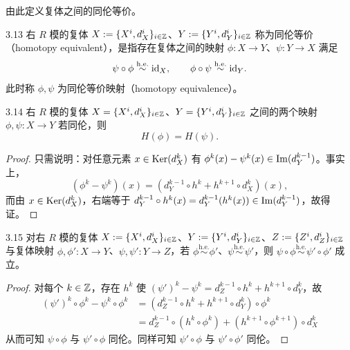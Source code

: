 
由此定义复体之间的同伦等价。

\begin{definition}{3.13}
右 $R$ 模的复体 $X:=\{X^i,d_X^i\}_{i\in\mathbb{Z}}$、$Y:=\{Y^i,d_Y^i\}_{i\in\mathbb{Z}}$ 称为同伦等价（homotopy equivalent），是指存在复体之间的映射 $\phi\colon X\to Y$、$\psi\colon Y\to X$ 满足
\[
\psi\circ\phi\overset{\mathrm{h.e.}}{\sim}\mathrm{id}_X,\qquad \phi\circ\psi\overset{\mathrm{h.e.}}{\sim}\mathrm{id}_Y.
\]
此时称 $\phi,\psi$ 为同伦等价映射（homotopy equivalence）。
\end{definition}

\begin{theorem}{3.14}
右 $R$ 模的复体 $X=\{X^i,d_X^i\}_{i\in\mathbb{Z}}$、$Y=\{Y^i,d_Y^i\}_{i\in\mathbb{Z}}$ 之间的两个映射 $\phi,\psi\colon X\to Y$ 若同伦，则
\[
H(\phi)=H(\psi).
\]
\end{theorem}

\begin{proof}
只需说明：对任意元素 $x\in\operatorname{Ker}(d_X^k)$ 有 $\phi^k(x)-\psi^k(x)\in\operatorname{Im}(d_Y^{k-1})$。事实上，
\[
(\phi^k-\psi^k)(x)=(d_Y^{k-1}\circ h^k+h^{k+1}\circ d_X^k)(x),
\]
而由 $x\in\operatorname{Ker}(d_X^k)$，右端等于 $d_Y^{k-1}\circ h^k(x)=d_Y^{k-1}(h^k(x))\in\operatorname{Im}(d_Y^{k-1})$，故得证。
\end{proof}

\begin{lemma}{3.15}
对右 $R$ 模的复体 $X:=\{X^i,d_X^i\}_{i\in\mathbb{Z}}$、$Y:=\{Y^i,d_Y^i\}_{i\in\mathbb{Z}}$、$Z:=\{Z^i,d_Z^i\}_{i\in\mathbb{Z}}$ 与复体映射 $\phi,\phi'\colon X\to Y$、$\psi,\psi'\colon Y\to Z$，若 $\phi\overset{\mathrm{h.e.}}{\sim}\phi'$、$\psi\overset{\mathrm{h.e.}}{\sim}\psi'$，则 $\psi\circ\phi\overset{\mathrm{h.e.}}{\sim}\psi'\circ\phi'$ 成立。
\end{lemma}

\begin{proof}
对每个 $k\in\mathbb{Z}$，存在 $h^k$ 使 $(\psi')^k-\psi^k=d_Z^{k-1}\circ h^k+h^{k+1}\circ d_Y^k$，故
\[
\begin{aligned}
(\psi')^k\circ\phi^k-\psi^k\circ\phi^k
&=(d_Z^{k-1}\circ h^k+h^{k+1}\circ d_Y^k)\circ\phi^k\\
&=d_Z^{k-1}\circ(h^k\circ\phi^k)+(h^{k+1}\circ\phi^{k+1})\circ d_X^k
\end{aligned}
\]
从而可知 $\psi\circ\phi$ 与 $\psi'\circ\phi$ 同伦。同样可知 $\psi'\circ\phi$ 与 $\psi'\circ\phi'$ 同伦。
\end{proof}


